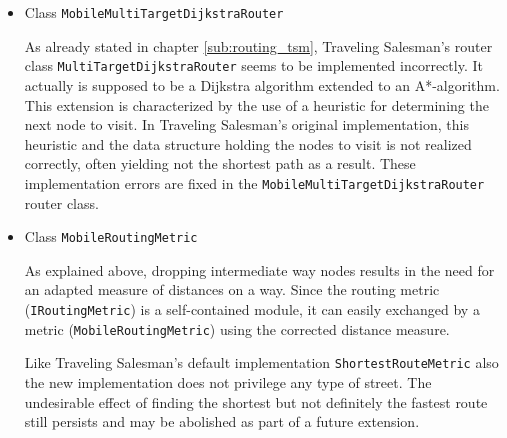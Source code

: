 \begin{itemize}
	\item Class \texttt{MobileMultiTargetDijkstraRouter}

		As already stated in chapter \ref{sub:routing_tsm}, Traveling Salesman's router class \texttt{MultiTargetDijkstraRouter} seems to be implemented incorrectly. It actually is supposed to be a Dijkstra algorithm extended to an A*-algorithm. This extension is characterized by the use of a heuristic for determining the next node to visit. In Traveling Salesman's original implementation, this heuristic and the data structure holding the nodes to visit is not realized correctly, often yielding not the shortest path as a result. These implementation errors are fixed in the \texttt{MobileMultiTargetDijkstraRouter} router class.
	
	\item Class \texttt{MobileRoutingMetric}
	
		As explained above, dropping intermediate way nodes results in the need for an adapted measure of distances on a way. Since the routing metric (\texttt{IRoutingMetric}) is a self-contained module, it can easily exchanged by a metric (\texttt{MobileRoutingMetric}) using the corrected distance measure.\newline
		
		Like Traveling Salesman's default implementation \texttt{ShortestRouteMetric} also the new implementation does not privilege any type of street. The undesirable effect of finding the shortest but not definitely the fastest route still persists and may be abolished as part of a future extension.

\end{itemize}



